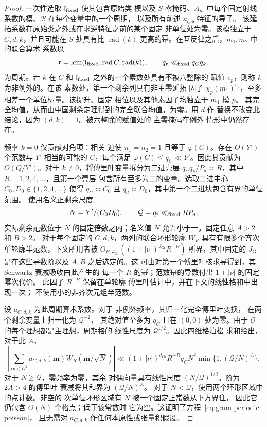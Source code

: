 \documentclass[11pt,a4paper]{article}
\numberwithin{equation}{section}
\numberwithin{figure}{section}
\theoremstyle{definition}
\theoremstyle{remark}
\begin{document}
\begin{proof}
一次性选取 $\mathfrak l_{\rm fixed}$ 使其包含原始类
模以及 $S$ 零掩码、$A_m$ 中每个固定射线
系数的模、$\mathcal R$ 在每个变量中的一个周期，
以及所有前述
$\kappa_{\zeta,\boldsymbol e}$ 特征的导子。
该延拓系数在原始类之外或在求逆特征之前的某个固定
非单位处为零。该模独立于 $C,d,k$，并且可能在 $S$ 处具有比
$\operatorname{rad}(k)$ 更高的幂。在互反律之后，$m_1,m_2$ 中的联合算术
系数以
\[
 \mathfrak r=\operatorname{lcm}
   (\mathfrak l_{\rm fixed},\operatorname{rad}C,\operatorname{rad}(k)),
 \qquad q_{\mathfrak r}\ll_{\rm fixed}q_Cq_k.
\]
为周期。若 $k$ 在 $C$ 和 $\mathfrak l_{\rm fixed}$ 之外的一个素数处具有不被六整除的
赋值 $e_p$，则称 $k$ 为非例外的。在该
素数处，第一个剩余列具有非主零延拓
因子 $\chi_p(m_1)^{e_p}$，至多相差一个单位标量。该提升、固定
相位以及其他素因子均独立于 $m_1$ 模 $p$。
其完全均值，从而由中国剩余定理得到的完全联合均值，为零。用 $d$ 作
替换不改变此结论，因为 $(d,k)=1$。被六整除的赋值处的
主零掩码在例外
情形中仍然存在。

频率 $k=0$ 仅贡献对角项：相关
迫使 $n_1=n_2=1$ 且等于 $\varphi(C)$。存在 $O(Y')$
个范数与 $Y'$ 相当的可能的 $C$，每个满足
$\varphi(C)\le q_C\ll Y'$。因此其贡献为
$O(Q/Y')$。对于 $k\ne0$，将傅里叶变量拆分为二进壳层
$q_Cq_k/P_a\asymp R$，其中 $R=1,2,4,\ldots$，且第一个壳层
包含所有至多为二的变量。选取二进中心
$C_0,D_0\in\{1,2,4,\ldots\}$ 使得 $q_C\asymp C_0$ 且
$q_d\asymp D_0$，其中第一个二进块包含有界的单位范围。
使用名义正剩余尺度
\[
 N=Y'/(C_0D_0),\qquad
 \mathcal Q=q_{\mathfrak r}\ll_{\rm fixed}RP_a.
\]
实际剩余范数位于 $N$ 的固定倍数之内；名义值
$N$ 允许小于一。固定任意 $A>2$ 和 $B>2$。
对于每个固定的 $C,d,k$，两列的联合环形轮廓 $W_R$ 具有有限多个齐次单轮廓半范数，下文所用者被
$O_{B,J_{\mathrm{Gr}}}((1+|\nu|)^{J_{\mathrm{Gr}}} R^{-B})$ 所界，其中固定的
$J_{\mathrm{Gr}}$ 是在这些导数阶以及 $A,B$ 之后选定的。这
可由对第一个傅里叶核求导得到，其 Schwartz 衰减吸收由此产生的
每一个 $R$ 的幂；范数幂的导数付出 $1+|\nu|$ 的固定幂次代价。
此因子 $R^{-B}$ 保留在单轮廓
傅里叶估计中，并在下文的线性格和中出现一次；
不使用小的非齐次元组半范数。

设 $a_{C,d,k}$ 为此周期算术系数。对于
非例外频率，其归一化完全傅里叶变换，
在两个剩余变量上归一化为 $\mathcal Q^{-2}$，
其绝对值至多为 $q_C$ 且在 $(0,0)$ 处为零。由于
$\mathcal O$ 的每个理想都是主理想，周期格的
线性尺度为 $\mathcal Q^{1/2}$。因此四维格泊松
求和给出，对于此 $A$，
\begin{equation}
 \left|\sum_{\mathbf m\in\mathcal O^2}
       a_{C,d,k}(\mathbf m)W_R(\mathbf m/\sqrt N)\right|
 \ll (1+|\nu|)^{J_{\mathrm{Gr}}} R^{-B}q_C N^2
             \min\{1,(\mathcal Q/N)^A\}.
 \label{eq:gram-periodic-poisson}
\end{equation}
对于 $N\ge\mathcal Q$，零频率为零，其余
对偶向量具有线性尺度 $(N/\mathcal Q)^{1/2}$。阶为 $2A>4$ 的傅里叶
衰减将其和界为 $(\mathcal Q/N)^A$。
对于 $N<\mathcal Q$，使用两个环形区域中的点计数。非空的
次单位环形区域有 $N$ 被一个固定正常数从下方界住，
因此它仍包含 $O(N)$ 个格点；低于该常数时
它为空。这证明了方程~\eqref{eq:gram-periodic-poisson}，
且无需对 $a_{C,d,k}$ 作任何本原性或张量积假设。


\end{proof}
\end{document}
